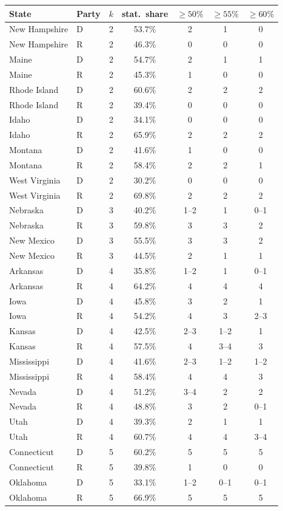 \begin{tabular}{llrcccc}
\toprule
State & Party & $k$ & stat.\ share & $\ge50\%$ & $\ge55\%$ & $\ge60\%$ \\
\midrule
New Hampshire & D & 2 & 53.7\% & 2 & 1 & 0 \\
New Hampshire & R & 2 & 46.3\% & 0 & 0 & 0 \\
Maine & D & 2 & 54.7\% & 2 & 1 & 1 \\
Maine & R & 2 & 45.3\% & 1 & 0 & 0 \\
Rhode Island & D & 2 & 60.6\% & 2 & 2 & 2 \\
Rhode Island & R & 2 & 39.4\% & 0 & 0 & 0 \\
Idaho & D & 2 & 34.1\% & 0 & 0 & 0 \\
Idaho & R & 2 & 65.9\% & 2 & 2 & 2 \\
Montana & D & 2 & 41.6\% & 1 & 0 & 0 \\
Montana & R & 2 & 58.4\% & 2 & 2 & 1 \\
West Virginia & D & 2 & 30.2\% & 0 & 0 & 0 \\
West Virginia & R & 2 & 69.8\% & 2 & 2 & 2 \\
Nebraska & D & 3 & 40.2\% & 1--2 & 1 & 0--1 \\
Nebraska & R & 3 & 59.8\% & 3 & 3 & 2 \\
New Mexico & D & 3 & 55.5\% & 3 & 3 & 2 \\
New Mexico & R & 3 & 44.5\% & 2 & 1 & 1 \\
Arkansas & D & 4 & 35.8\% & 1--2 & 1 & 0--1 \\
Arkansas & R & 4 & 64.2\% & 4 & 4 & 4 \\
Iowa & D & 4 & 45.8\% & 3 & 2 & 1 \\
Iowa & R & 4 & 54.2\% & 4 & 3 & 2--3 \\
Kansas & D & 4 & 42.5\% & 2--3 & 1--2 & 1 \\
Kansas & R & 4 & 57.5\% & 4 & 3--4 & 3 \\
Mississippi & D & 4 & 41.6\% & 2--3 & 1--2 & 1--2 \\
Mississippi & R & 4 & 58.4\% & 4 & 4 & 3 \\
Nevada & D & 4 & 51.2\% & 3--4 & 2 & 2 \\
Nevada & R & 4 & 48.8\% & 3 & 2 & 0--1 \\
Utah & D & 4 & 39.3\% & 2 & 1 & 1 \\
Utah & R & 4 & 60.7\% & 4 & 4 & 3--4 \\
Connecticut & D & 5 & 60.2\% & 5 & 5 & 5 \\
Connecticut & R & 5 & 39.8\% & 1 & 0 & 0 \\
Oklahoma & D & 5 & 33.1\% & 1--2 & 0--1 & 0--1 \\
Oklahoma & R & 5 & 66.9\% & 5 & 5 & 5 \\
\bottomrule
\end{tabular}
